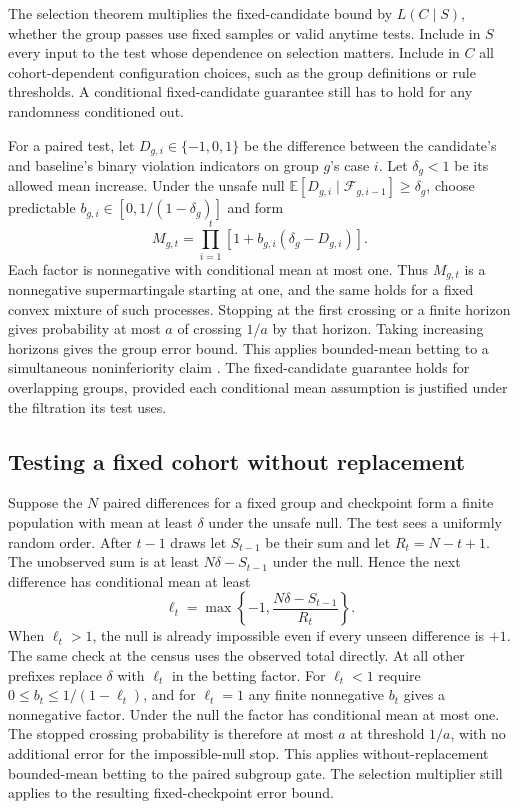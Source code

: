 \documentclass[11pt]{article}
\begin{document}
The selection theorem multiplies the fixed-candidate bound by
$L(C\mid S)$, whether the group passes use fixed samples or
valid anytime tests. Include in $S$ every input to the test
whose dependence on selection matters. Include in $C$ all
cohort-dependent configuration choices, such as the group
definitions or rule thresholds. A conditional fixed-candidate
guarantee still has to hold for any randomness conditioned out.

For a paired test, let $D_{g,i}\in\{-1,0,1\}$ be the difference
between the candidate's and baseline's binary violation indicators
on group $g$'s case $i$. Let $\delta_g<1$ be its allowed mean
increase. Under the unsafe null
$\mathbb E[D_{g,i}\mid\mathcal F_{g,i-1}]\ge\delta_g$,
choose predictable $b_{g,i}\in[0,1/(1-\delta_g)]$ and form
\[
 M_{g,t}=\prod_{i=1}^t[1+b_{g,i}(\delta_g-D_{g,i})].
\]
Each factor is nonnegative with conditional mean at most one.
Thus $M_{g,t}$ is a nonnegative supermartingale starting at one,
and the same holds for a fixed convex mixture of such processes.
Stopping at the first crossing or a finite horizon gives probability
at most $a$ of crossing $1/a$ by that horizon. Taking increasing
horizons gives the group error bound. This applies bounded-mean
betting \cite{waudby} to a simultaneous noninferiority claim
\cite{chang}. The fixed-candidate guarantee holds for overlapping
groups, provided each conditional mean assumption is justified under
the filtration its test uses.

\subsection{Testing a fixed cohort without replacement}
Suppose the $N$ paired differences for a fixed group and checkpoint
form a finite population with mean at least $\delta$ under the unsafe
null. The test sees a uniformly random order. After $t-1$ draws let
$S_{t-1}$ be their sum and let $R_t=N-t+1$. The unobserved sum is at
least $N\delta-S_{t-1}$ under the null. Hence the next difference has
conditional mean at least
\[
 \ell_t=\max\left\{-1,\frac{N\delta-S_{t-1}}{R_t}\right\}.
\]
When $\ell_t>1$, the null is already impossible even if every unseen
difference is $+1$. The same check at the census uses the observed
total directly. At all other prefixes replace $\delta$ with $\ell_t$
in the betting factor. For $\ell_t<1$ require
$0\le b_t\le 1/(1-\ell_t)$, and for $\ell_t=1$ any finite
nonnegative $b_t$ gives a nonnegative factor. Under the null the
factor has conditional mean at most one. The stopped crossing
probability is therefore at most $a$ at threshold $1/a$, with no
additional error for the impossible-null stop. This applies
without-replacement bounded-mean betting \cite{waudby} to the paired
subgroup gate. The selection multiplier still applies to the
resulting fixed-checkpoint error bound.
\end{document}
